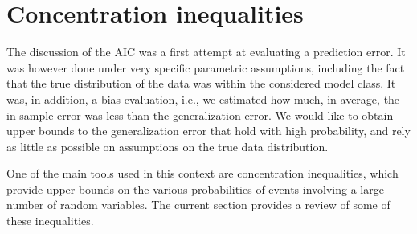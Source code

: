 

\section{Concentration inequalities}
\label{sec:ci}

The discussion of the AIC was a first attempt at evaluating a prediction error.
It was however done under very specific parametric assumptions, including the fact that the true distribution of the data was within the considered model class.
It was, in addition, a bias evaluation, i.e., we estimated how much, in average, the in-sample error was less than the generalization error.
We would like to obtain upper bounds to the generalization error that hold with high probability, and rely as little as possible on assumptions on the true data distribution. 

One of the main tools used in this context are concentration inequalities, which provide upper bounds on the various probabilities of events involving a large number of random variables. The current section provides a review of some of these inequalities.
\bigskip



